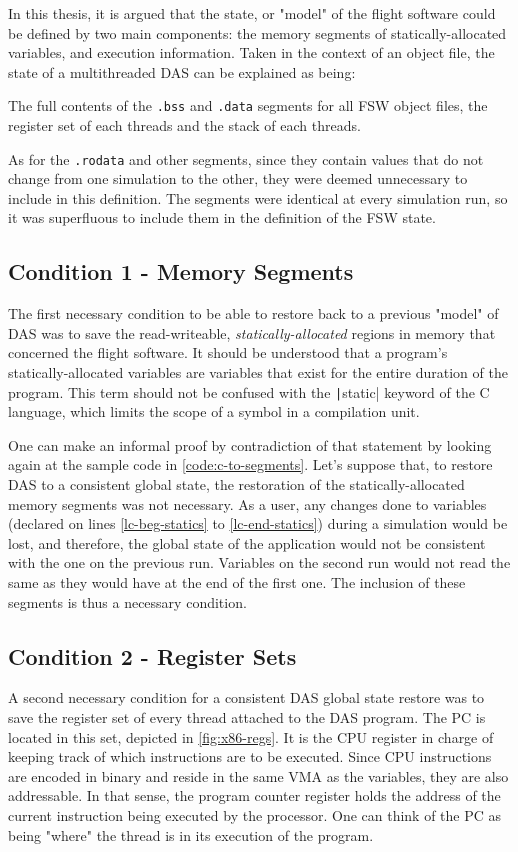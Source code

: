 {In this thesis, it is argued that the state, or "model" of the flight software could be defined by two main components: the memory segments of statically-allocated variables, and execution information. Taken in the context of an object file, the state of a multithreaded DAS can be explained as being:
\begin{shadedquotation}
The full contents of the \texttt{.bss} and \texttt{.data} segments for all FSW object files, the register set of each threads and the stack of each threads. 
\end{shadedquotation}

As for the \texttt{.rodata} and other segments, since they contain values that do not change from one simulation to the other, they were deemed unnecessary to include in this definition. The segments were identical at every simulation run, so it was superfluous to include them in the definition of the FSW state.

\subsection*{Condition 1 - Memory Segments}
The first necessary condition to be able to restore back to a previous "model" of DAS was to save the read-writeable, \textit{statically-allocated} regions in memory that concerned the flight software. It should be understood that a program's statically-allocated variables are variables that exist for the entire duration of the program. This term should not be confused with the \texttt|static| keyword of the C language, which limits the scope of a symbol in a compilation unit.

One can make an informal proof by contradiction of that statement by looking again at the sample code in \autoref{code:c-to-segments}. Let's suppose that, to restore DAS to a consistent global state, the restoration of the statically-allocated memory segments was not necessary. As a user, any changes done to variables (declared on lines \ref{lc-beg-statics} to \ref{lc-end-statics}) during a simulation would be lost, and therefore, the global state of the application would not be consistent with the one on the previous run. Variables on the second run would not read the same as they would have at the end of the first one. The inclusion of these segments is thus a necessary condition.

\subsection*{Condition 2 - Register Sets}
A second necessary condition for a consistent DAS global state restore was to save the register set of every thread attached to the DAS program. The \gls{PC} is located in this set, depicted in \autoref{fig:x86-regs}. It is the CPU register in charge of keeping track of which instructions are to be executed. Since CPU instructions are encoded in binary and reside in the same \gls{VMA} as the variables, they are also addressable. In that sense, the program counter register holds the address of the current instruction being executed by the processor. One can think of the PC as being "where" the thread is in its execution of the program.

}
